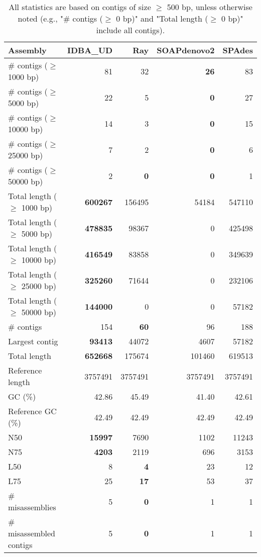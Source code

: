 \documentclass[12pt,a4paper]{article}
\begin{document}
\begin{table}[ht]
\begin{center}
\caption{All statistics are based on contigs of size $\geq$ 500 bp, unless otherwise noted (e.g., "\# contigs ($\geq$ 0 bp)" and "Total length ($\geq$ 0 bp)" include all contigs).}
\begin{tabular}{|l*{4}{|r}|}
\hline
Assembly & IDBA\_UD & Ray & SOAPdenovo2 & SPAdes \\ \hline
\# contigs ($\geq$ 1000 bp) & 81 & 32 & {\bf 26} & 83 \\ \hline
\# contigs ($\geq$ 5000 bp) & 22 & 5 & {\bf 0} & 27 \\ \hline
\# contigs ($\geq$ 10000 bp) & 14 & 3 & {\bf 0} & 15 \\ \hline
\# contigs ($\geq$ 25000 bp) & 7 & 2 & {\bf 0} & 6 \\ \hline
\# contigs ($\geq$ 50000 bp) & 2 & {\bf 0} & {\bf 0} & 1 \\ \hline
Total length ($\geq$ 1000 bp) & {\bf 600267} & 156495 & 54184 & 547110 \\ \hline
Total length ($\geq$ 5000 bp) & {\bf 478835} & 98367 & 0 & 425498 \\ \hline
Total length ($\geq$ 10000 bp) & {\bf 416549} & 83858 & 0 & 349639 \\ \hline
Total length ($\geq$ 25000 bp) & {\bf 325260} & 71644 & 0 & 232106 \\ \hline
Total length ($\geq$ 50000 bp) & {\bf 144000} & 0 & 0 & 57182 \\ \hline
\# contigs & 154 & {\bf 60} & 96 & 188 \\ \hline
Largest contig & {\bf 93413} & 44072 & 4607 & 57182 \\ \hline
Total length & {\bf 652668} & 175674 & 101460 & 619513 \\ \hline
Reference length & 3757491 & 3757491 & 3757491 & 3757491 \\ \hline
GC (\%) & 42.86 & 45.49 & 41.40 & 42.61 \\ \hline
Reference GC (\%) & 42.49 & 42.49 & 42.49 & 42.49 \\ \hline
N50 & {\bf 15997} & 7690 & 1102 & 11243 \\ \hline
N75 & {\bf 4203} & 2119 & 696 & 3153 \\ \hline
L50 & 8 & {\bf 4} & 23 & 12 \\ \hline
L75 & 25 & {\bf 17} & 53 & 37 \\ \hline
\# misassemblies & 5 & {\bf 0} & 1 & 1 \\ \hline
\# misassembled contigs & 5 & {\bf 0} & 1 & 1 \\ \hline

\end{tabular}
\end{center}
\end{table}
\end{document}
